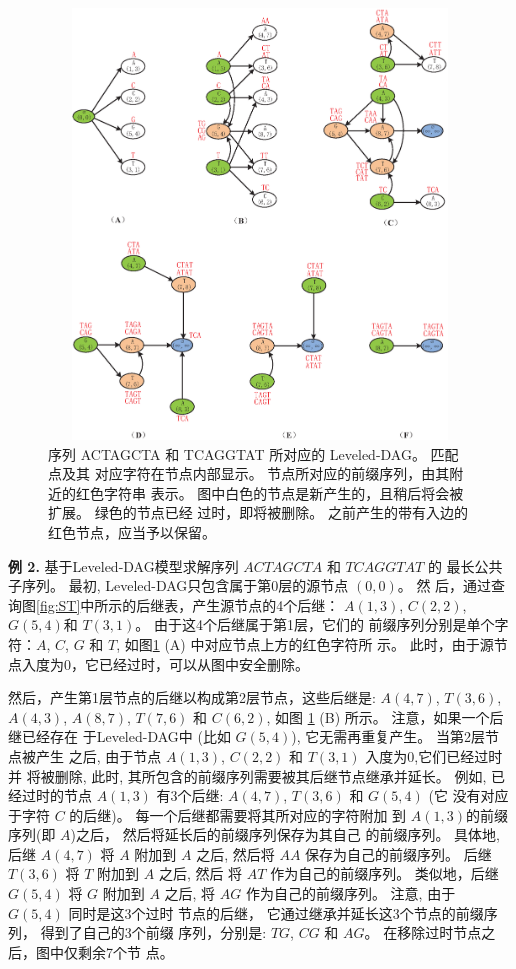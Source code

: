 \begin{figure}[!h]
  \centering
  \includegraphics[height=4.5in,
  width=4.5in]{figures/4_MLCS/Level_DAG}
  \vspace{1.5em}
  \caption{序列 ACTAGCTA 和 TCAGGTAT 所对应的 Leveled-DAG。 匹配点及其
    对应字符在节点内部显示。 节点所对应的前缀序列，由其附近的红色字符串
    表示。 图中白色的节点是新产生的，且稍后将会被扩展。 绿色的节点已经
    过时，即将被删除。 之前产生的带有入边的红色节点，应当予以保留。}
  \label{fig:Leveled-DAG}
\end{figure}

\textbf{例 2.} 基于Leveled-DAG模型求解序列 $ACTAGCTA$ 和 $TCAGGTAT$ 的
最长公共子序列。 最初, Leveled-DAG只包含属于第0层的源节点 $(0, 0)$。 然
后，通过查询图\ref{fig:ST}中所示的后继表，产生源节点的4个后继： $A(1,
3)$, $C(2, 2)$, $G(5, 4)$和 $T(3, 1)$。 由于这4个后继属于第1层，它们的
前缀序列分别是单个字符：$A$, $C$,
$G$ 和 $T$, 如图\ref{fig:Leveled-DAG} (A) 中对应节点上方的红色字符所
示。 此时，由于源节点入度为0，它已经过时，可以从图中安全删除。

然后，产生第1层节点的后继以构成第2层节点，这些后继是: $A(4, 7)$, $T(3,
6)$, $A(4, 3)$, $A(8, 7)$, $T(7, 6)$ 和 $C(6,
2)$, 如图 \ref{fig:Leveled-DAG} (B) 所示。 注意，如果一个后继已经存在
于Leveled-DAG中 (比如 $G(5, 4)$), 它无需再重复产生。 当第2层节点被产生
之后, 由于节点 $A(1, 3)$, $C(2, 2)$ 和 $T(3, 1)$ 入度为0,它们已经过时并
将被删除, 此时, 其所包含的前缀序列需要被其后继节点继承并延长。 例如, 已
经过时的节点 $A(1, 3)$ 有3个后继: $A(4, 7)$, $T(3, 6)$ 和 $G(5, 4)$ (它
没有对应于字符 $C$ 的后继)。 每一个后继都需要将其所对应的字符附加
到 $A(1, 3)$的前缀序列(即 $A$)之后， 然后将延长后的前缀序列保存为其自己
的前缀序列。 具体地,后继 $A(4, 7)$ 将 $A$ 附加到 $A$ 之后, 然后将 $AA$
保存为自己的前缀序列。 后继 $T(3, 6)$ 将 $T$ 附加到 $A$ 之后, 然后
将 $AT$ 作为自己的前缀序列。 类似地，后继 $G(5, 4)$ 将 $G$ 附加到 $A$
之后, 将 $AG$ 作为自己的前缀序列。 注意, 由于 $G(5, 4)$ 同时是这3个过时
节点的后继， 它通过继承并延长这3个节点的前缀序列， 得到了自己的3个前缀
序列，分别是: $TG$, $CG$ 和 $AG$。 在移除过时节点之后，图中仅剩余7个节
点。

